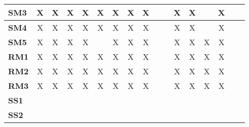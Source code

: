 \documentclass[12pt]{article}
\begin{document}
\begin{table}[H]
\begin{adjustwidth}{-0.1in}{-1in}
{\begin{tabular}{c|c|c|c|c|c|c|c|c|c|c|c|c|c|c|c|c|}
\multicolumn{1}{|l|}{\textbf{SM3}}   &      X       &       X      &       X      &       X      &       X      &       X      &       X      &       X      &              &              &       X      &       X      &              &       X      &             &              \\ \hline
\multicolumn{1}{|l|}{\textbf{SM4}}   &      X       &       X      &       X      &       X      &       X      &       X      &       X      &       X      &              &              &       X      &       X      &              &       X      &             &              \\ \hline
\multicolumn{1}{|l|}{\textbf{SM5}}   &      X       &       X      &       X      &       X      &              &       X      &       X      &       X      &              &              &       X      &       X      &       X      &       X      &             &              \\ \hline
\multicolumn{1}{|l|}{\textbf{RM1}}   &      X       &       X      &       X      &       X      &       X      &       X      &       X      &       X      &              &              &       X      &       X      &       X      &       X      &             &              \\ \hline
\multicolumn{1}{|l|}{\textbf{RM2}}   &      X       &       X      &       X      &       X      &       X      &       X      &       X      &       X      &              &              &       X      &       X      &       X      &       X      &             &              \\ \hline
\multicolumn{1}{|l|}{\textbf{RM3}}   &      X       &       X      &       X      &       X      &       X      &       X      &       X      &       X      &              &              &       X      &       X      &       X      &       X      &             &              \\ \hline
\multicolumn{1}{|l|}{\textbf{SS1}}   &              &              &              &              &              &              &              &              &              &              &              &              &              &              &             &              \\ \hline
\multicolumn{1}{|l|}{\textbf{SS2}}   &              &              &              &              &              &              &              &              &              &              &              &              &              &              &             &              \\ \hline

\end{tabular}}
\end{adjustwidth}
\end{table}
\end{document}
